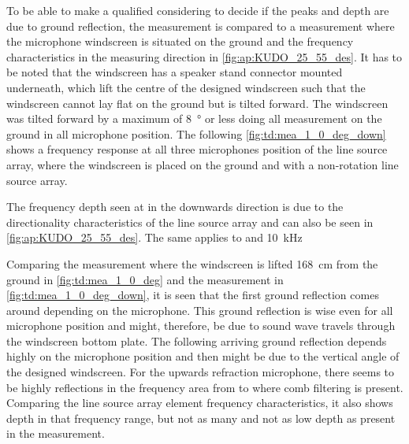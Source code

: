 

To be able to make a qualified considering to decide if the peaks and depth are due to ground reflection, the measurement is compared to a measurement where the microphone windscreen is situated on the ground and the frequency characteristics in the measuring direction in \autoref{fig:ap:KUDO_25_55_des}.  It has to be noted that the windscreen has a speaker stand connector mounted underneath, which lift the centre of the designed windscreen such that the windscreen cannot lay flat on the ground but is tilted forward. The windscreen was tilted forward by a maximum of \SI{8}{\degree} or less doing all measurement on the ground in all microphone position. The following \autoref{fig:td:mea_1_0_deg_down} shows a frequency response at all three microphones position of the line source array, where the windscreen is placed on the ground and with a non-rotation line source array.


The frequency depth seen at  in the downwards direction is due to the directionality characteristics of the line source array and can also be seen in \autoref{fig:ap:KUDO_25_55_des}. The same applies to  and \SI{10}{\kilo\hertz}

Comparing the measurement where the windscreen is lifted \SI{168}{\centi\meter} from the ground in \autoref{fig:td:mea_1_0_deg} and the measurement in \autoref{fig:td:mea_1_0_deg_down}, it is seen that the first ground reflection comes around  depending on the microphone. This ground reflection is \db wise even for all microphone position and might, therefore, be due to sound wave travels through the windscreen bottom plate. The following arriving ground reflection depends highly on the microphone position and then might be due to the vertical angle of the designed windscreen. For the upwards refraction microphone, there seems to be highly reflections in the frequency area from  to  where comb filtering is present. Comparing the line source array element frequency characteristics, it also shows depth in that frequency range, but not as many and not as low depth as present in the measurement. 

